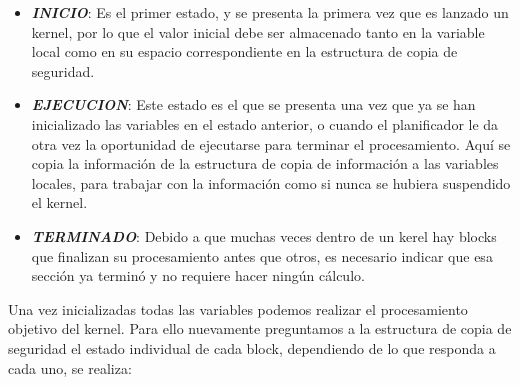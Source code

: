 \begin{itemize}
\item \textit{\textbf{INICIO}}: Es el primer estado, y se presenta la primera vez que es lanzado un kernel, por lo que el valor inicial debe ser almacenado tanto en la variable local como en su espacio correspondiente en la estructura de copia de seguridad.

\item \textit{\textbf{EJECUCION}}: Este estado es el que se presenta una vez que ya se han inicializado las variables en el estado anterior, o cuando el planificador le da otra vez la oportunidad de ejecutarse para terminar el procesamiento. Aquí se copia la información de la estructura de copia de información a las variables locales, para trabajar con la información como si nunca se hubiera suspendido el kernel.

\item \textit{\textbf{TERMINADO}}: Debido a que muchas veces dentro de un kerel hay blocks que finalizan su procesamiento antes que otros, es necesario indicar que esa sección ya terminó y no requiere hacer ningún cálculo.
\end{itemize}



Una vez inicializadas todas las variables podemos realizar el procesamiento objetivo del kernel. Para ello nuevamente preguntamos a la estructura de copia de seguridad el estado individual de cada block, dependiendo de lo que responda a cada uno, se realiza:

